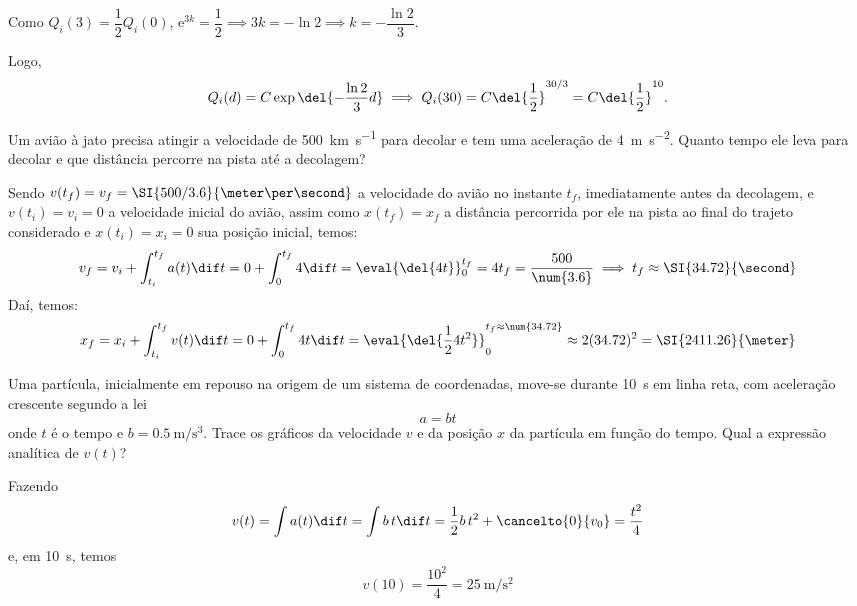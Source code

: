 \documentclass[]{IMTexam}
\begin{document}
\begin{questions}
\begin{solution}
		Como $ Q_i(3)=\dfrac{1}{2}Q_i(0) $, $ \mathrm{e}^{3k}=\dfrac{1}{2}\implies 3k=-\ln{2}\implies k=-\dfrac{\ln{2}}{3} $.

		Logo,
		\[ Q_i(d)=C\exp{\del{-\dfrac{\ln{2}}{3}d}}\implies Q_i(30)=C\del{\dfrac{1}{2}}^{30/3}=C\del{\dfrac{1}{2}}^{10}. \]
	\end{solution}

	\question
	Um avião à jato precisa atingir a velocidade de \SI{500}{\kilo\meter\per\second} para decolar e tem uma aceleração de \SI{4}{\meter\per\second\squared}. Quanto tempo ele leva para decolar e que distância percorre na pista até a decolagem?

	\begin{solution}
		Sendo $ v(t_f)=v_f=\SI{500/3.6}{\meter\per\second} $ a velocidade do avião no instante $ t_f $, imediatamente antes da decolagem, e $ v(t_i)=v_i=0 $ a velocidade inicial do avião, assim como $ x(t_f)=x_f $ a distância percorrida por ele na pista ao final do trajeto considerado e $ x(t_i)=x_i=0 $ sua posição inicial, temos:\[ v_f=v_i+ \int_{t_i}^{t_f}a(t)\dif t=0+\int_{0}^{t_f}4\dif t=\eval{\del{4t}}_{0}^{t_f}=4t_f=\dfrac{500}{\num{3.6}}\implies t_f\approx\SI{34.72}{\second} \]
		Daí, temos:
		\[ x_f=x_i+\int_{t_i}^{t_f}v(t)\dif t=0+\int_{0}^{t_f}4t \dif t=\eval{\del{\dfrac{1}{2}4t^{2}}}_{0}^{t_f\approx\num{34.72}}\approx2(34.72)^{2}=\SI{2411.26}{\meter} \]
	\end{solution}

	\question
	Uma partícula, inicialmente em repouso na origem de um sistema de coordenadas, move-se durante \SI{10}{\second} em linha reta, com aceleração crescente segundo a lei
	\[ a = bt \]
	onde $ t $ é o tempo e $ b = \SI{0.5}{\meter\per\second\cubed}$.
	Trace os gráficos da velocidade $ v $ e da posição $ x $ da partícula em função do tempo. Qual a expressão analítica de $ v(t) $?

	\begin{solution}

		\begin{multi}
			Fazendo
			\[ v(t)=\int a(t)\dif t=\int b\,t \dif t=\dfrac{1}{2}b\,t^{2}+\cancelto{0}{v_0}=\dfrac{t^{2}}{4} \]
			e, em \SI{10}{\second}, temos
			\[ v(10)=\dfrac{10^{2}}{4}=\SI{25}{\meter\per\second\squared} \]
			\nextcol

			\centering


\end{multi}
\end{solution}
\end{questions}
\end{document}
